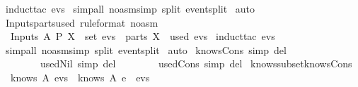 \begin{isabellebody}
  \ {\isacharparenleft}induct{\isacharunderscore}tac\ {\isachardoublequoteopen}evs{\isachardoublequoteclose}{\isacharparenright}\isanewline
  \isamarkupfalse%
  \ {\isacharparenleft}simp{\isacharunderscore}all\ {\isacharparenleft}no{\isacharunderscore}asm{\isacharunderscore}simp{\isacharparenright}\ split{\isacharcolon}\ event{\isachardot}split{\isacharparenright}\isanewline
  \isamarkupfalse%
  \ {\isacharparenleft}auto{\isacharparenright}\isanewline
  \isamarkupfalse%
  \endisatagproof
  {\isafoldproof}%
  \isadelimproof
  \isanewline
  \endisadelimproof
  \isanewline
  \isamarkupfalse%
  \ Inputs{\isacharunderscore}parts{\isacharunderscore}used\ {\isacharbrackleft}rule{\isacharunderscore}format\ {\isacharparenleft}no{\isacharunderscore}asm{\isacharparenright}{\isacharbrackright}\ {\isacharcolon}\isanewline
  \ \ {\isachardoublequoteopen}Inputs\ A\ P\ X\ {\isasymin}\ set\ evs\ {\isasymlongrightarrow}\ {\isacharparenleft}parts\ {\isacharbraceleft}X{\isacharbraceright}{\isacharparenright}\ {\isasymsubseteq}\ used\ evs{\isachardoublequoteclose}\isanewline
  \isadelimproof
  \endisadelimproof
  \isatagproof
  \isamarkupfalse%
  \ {\isacharparenleft}induct{\isacharunderscore}tac\ {\isachardoublequoteopen}evs{\isachardoublequoteclose}{\isacharparenright}\isanewline
  \isamarkupfalse%
  \ {\isacharparenleft}simp{\isacharunderscore}all\ {\isacharparenleft}no{\isacharunderscore}asm{\isacharunderscore}simp{\isacharparenright}\ split{\isacharcolon}\ event{\isachardot}split{\isacharparenright}\isanewline
  \isamarkupfalse%
  \ {\isacharparenleft}auto{\isacharparenright}\isanewline
  \isamarkupfalse%
  \endisatagproof
  {\isafoldproof}%
  \isadelimproof
  \isanewline
  \endisadelimproof
  \isanewline
  \isanewline
  \isamarkupfalse%
  \ knows{\isacharunderscore}Cons\ {\isacharbrackleft}simp\ del{\isacharbrackright}\isanewline
  \ \ \ \ \ \ \ \ used{\isacharunderscore}Nil\ {\isacharbrackleft}simp\ del{\isacharbrackright}\isanewline
  \ \ \ \ \ \ \ \ used{\isacharunderscore}Cons\ {\isacharbrackleft}simp\ del{\isacharbrackright}\isanewline
  \isanewline
  \isamarkupfalse%
  \ knows{\isacharunderscore}subset{\isacharunderscore}knows{\isacharunderscore}Cons\ {\isacharcolon}\isanewline
  \ \ {\isachardoublequoteopen}knows\ A\ evs\ {\isasymsubseteq}\ knows\ A\ {\isacharparenleft}e\ {\isacharhash}\ evs{\isacharparenright}{\isachardoublequoteclose}\isanewline

\end{isabellebody}
